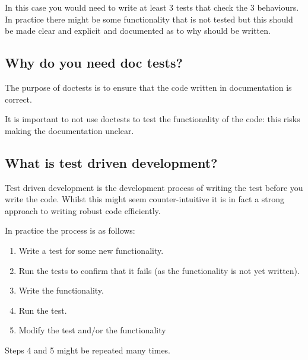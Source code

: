 In this case you would need to write at least 3 tests that check the 3
behaviours.
In practice there might be some functionality that is not tested but this should
be made clear and explicit and documented as to why should be written.


\subsection{Why do you need doc tests?}
\label{\detokenize{building-tools/07-testing/why/main:why-do-we-need-doc-tests}}

The purpose of doctests is to ensure that the code written in documentation is
correct.

It is important to not use doctests to test the functionality of the code: this
risks making the documentation unclear.


\subsection{What is test driven development?}
\label{\detokenize{building-tools/07-testing/why/main:what-is-test-driven-development}}

Test driven development is the development process of writing the test before
you write the code. Whilst this might seem counter-intuitive it is in fact a
strong approach to writing robust code efficiently.


In practice the process is as follows:
\begin{enumerate}

\item 

Write a test for some new functionality.

\item 

Run the tests to confirm that it fails (as the functionality is not yet
written).

\item 

Write the functionality.

\item 

Run the test.

\item 

Modify the test and/or the functionality

\end{enumerate}


Steps 4 and 5 might be repeated many times.


